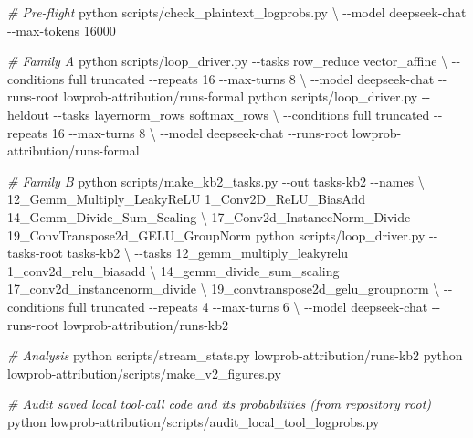 \documentclass[
  11pt,
]{article}
\newenvironment{Shaded}{}{}
\newcommand{\AttributeTok}[1]{\textcolor[rgb]{0.49,0.56,0.16}{#1}}
\newcommand{\CommentTok}[1]{\textcolor[rgb]{0.38,0.63,0.69}{\textit{#1}}}
\newcommand{\DataTypeTok}[1]{\textcolor[rgb]{0.56,0.13,0.00}{#1}}
\newcommand{\ExtensionTok}[1]{#1}
\newcommand{\NormalTok}[1]{#1}
\begin{document}
\begin{Shaded}
\begin{Highlighting}[]
\CommentTok{\# Pre{-}flight}
\ExtensionTok{python}\NormalTok{ scripts/check\_plaintext\_logprobs.py }\DataTypeTok{\textbackslash{}}
    \AttributeTok{{-}{-}model}\NormalTok{ deepseek{-}chat }\AttributeTok{{-}{-}max{-}tokens}\NormalTok{ 16000}

\CommentTok{\# Family A}
\ExtensionTok{python}\NormalTok{ scripts/loop\_driver.py }\AttributeTok{{-}{-}tasks}\NormalTok{ row\_reduce vector\_affine }\DataTypeTok{\textbackslash{}}
    \AttributeTok{{-}{-}conditions}\NormalTok{ full truncated }\AttributeTok{{-}{-}repeats}\NormalTok{ 16 }\AttributeTok{{-}{-}max{-}turns}\NormalTok{ 8 }\DataTypeTok{\textbackslash{}}
    \AttributeTok{{-}{-}model}\NormalTok{ deepseek{-}chat }\AttributeTok{{-}{-}runs{-}root}\NormalTok{ lowprob{-}attribution/runs{-}formal}
\ExtensionTok{python}\NormalTok{ scripts/loop\_driver.py }\AttributeTok{{-}{-}heldout} \AttributeTok{{-}{-}tasks}\NormalTok{ layernorm\_rows softmax\_rows }\DataTypeTok{\textbackslash{}}
    \AttributeTok{{-}{-}conditions}\NormalTok{ full truncated }\AttributeTok{{-}{-}repeats}\NormalTok{ 16 }\AttributeTok{{-}{-}max{-}turns}\NormalTok{ 8 }\DataTypeTok{\textbackslash{}}
    \AttributeTok{{-}{-}model}\NormalTok{ deepseek{-}chat }\AttributeTok{{-}{-}runs{-}root}\NormalTok{ lowprob{-}attribution/runs{-}formal}

\CommentTok{\# Family B}
\ExtensionTok{python}\NormalTok{ scripts/make\_kb2\_tasks.py }\AttributeTok{{-}{-}out}\NormalTok{ tasks{-}kb2 }\AttributeTok{{-}{-}names} \DataTypeTok{\textbackslash{}}
\NormalTok{    12\_Gemm\_Multiply\_LeakyReLU 1\_Conv2D\_ReLU\_BiasAdd 14\_Gemm\_Divide\_Sum\_Scaling }\DataTypeTok{\textbackslash{}}
\NormalTok{    17\_Conv2d\_InstanceNorm\_Divide 19\_ConvTranspose2d\_GELU\_GroupNorm}
\ExtensionTok{python}\NormalTok{ scripts/loop\_driver.py }\AttributeTok{{-}{-}tasks{-}root}\NormalTok{ tasks{-}kb2 }\DataTypeTok{\textbackslash{}}
    \AttributeTok{{-}{-}tasks}\NormalTok{ 12\_gemm\_multiply\_leakyrelu 1\_conv2d\_relu\_biasadd }\DataTypeTok{\textbackslash{}}
\NormalTok{            14\_gemm\_divide\_sum\_scaling 17\_conv2d\_instancenorm\_divide }\DataTypeTok{\textbackslash{}}
\NormalTok{            19\_convtranspose2d\_gelu\_groupnorm }\DataTypeTok{\textbackslash{}}
    \AttributeTok{{-}{-}conditions}\NormalTok{ full truncated }\AttributeTok{{-}{-}repeats}\NormalTok{ 4 }\AttributeTok{{-}{-}max{-}turns}\NormalTok{ 6 }\DataTypeTok{\textbackslash{}}
    \AttributeTok{{-}{-}model}\NormalTok{ deepseek{-}chat }\AttributeTok{{-}{-}runs{-}root}\NormalTok{ lowprob{-}attribution/runs{-}kb2}

\CommentTok{\# Analysis}
\ExtensionTok{python}\NormalTok{ scripts/stream\_stats.py lowprob{-}attribution/runs{-}kb2}
\ExtensionTok{python}\NormalTok{ lowprob{-}attribution/scripts/make\_v2\_figures.py}

\CommentTok{\# Audit saved local tool{-}call code and its probabilities (from repository root)}
\ExtensionTok{python}\NormalTok{ lowprob{-}attribution/scripts/audit\_local\_tool\_logprobs.py}
\end{Highlighting}
\end{Shaded}
\end{document}

